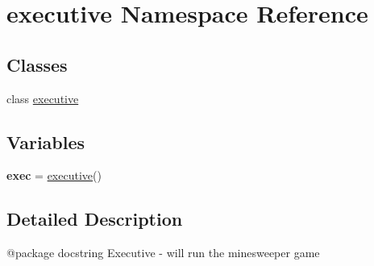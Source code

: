 \hypertarget{namespaceexecutive}{}\section{executive Namespace Reference}
\label{namespaceexecutive}
\subsection*{Classes}
\begin{DoxyCompactItemize}
\item 
class \mbox{\hyperlink{classexecutive_1_1executive}{executive}}
\end{DoxyCompactItemize}
\subsection*{Variables}
\begin{DoxyCompactItemize}
\item 
\mbox{\label{namespaceexecutive_abb6867f565f732bdfd67c820dd4cf5c4}} 
{\bfseries exec} = \mbox{\hyperlink{classexecutive_1_1executive}{executive}}()
\end{DoxyCompactItemize}


\subsection{Detailed Description}
\begin{DoxyVerb}@package docstring
   Executive - will run the minesweeper game
\end{DoxyVerb}
 